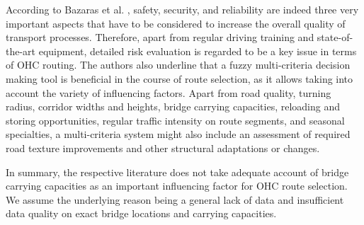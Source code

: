 \par
According to Bazaras et al. \cite{Bazaras.2013}, safety, security, and reliability are indeed three very important aspects that have to be considered to increase the overall quality of transport processes. Therefore, apart from regular driving training and state-of-the-art equipment, detailed risk evaluation is regarded to be a key issue in terms of OHC routing. The authors also underline that a fuzzy multi-criteria decision making tool is beneficial in the course of route selection, as it allows taking into account the variety of influencing factors. Apart from road quality, turning radius, corridor widths and heights, bridge carrying capacities, reloading and storing opportunities, regular traffic intensity on route segments, and seasonal specialties, a multi-criteria system might also include an assessment of required road texture improvements and other structural adaptations or changes.
\par
In summary, the respective literature does not take adequate account of bridge carrying capacities as an important influencing factor for OHC route selection. We assume the underlying reason being a general lack of data and insufficient data quality on exact bridge locations and carrying capacities.



%
%
%
%
